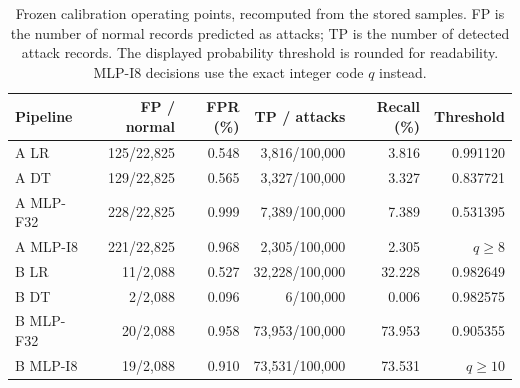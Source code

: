 \begin{table}[!htbp]
\caption{Frozen calibration operating points, recomputed from the stored samples. FP is the number of normal records predicted as attacks; TP is the number of detected attack records. The displayed probability threshold is rounded for readability. MLP-I8 decisions use the exact integer code $q$ instead.}\label{tab:calibration}
\centering\small
\begin{tabular}{lrrrrr}
\toprule
Pipeline & FP / normal & FPR (\%) & TP / attacks & Recall (\%) & Threshold \\
\midrule
A LR & 125/22,825 & 0.548 & 3,816/100,000 & 3.816 & 0.991120 \\
A DT & 129/22,825 & 0.565 & 3,327/100,000 & 3.327 & 0.837721 \\
A MLP-F32 & 228/22,825 & 0.999 & 7,389/100,000 & 7.389 & 0.531395 \\
A MLP-I8 & 221/22,825 & 0.968 & 2,305/100,000 & 2.305 & $q\geq 8$ \\
B LR & 11/2,088 & 0.527 & 32,228/100,000 & 32.228 & 0.982649 \\
B DT & 2/2,088 & 0.096 & 6/100,000 & 0.006 & 0.982575 \\
B MLP-F32 & 20/2,088 & 0.958 & 73,953/100,000 & 73.953 & 0.905355 \\
B MLP-I8 & 19/2,088 & 0.910 & 73,531/100,000 & 73.531 & $q\geq 10$ \\
\bottomrule
\end{tabular}
\end{table}
